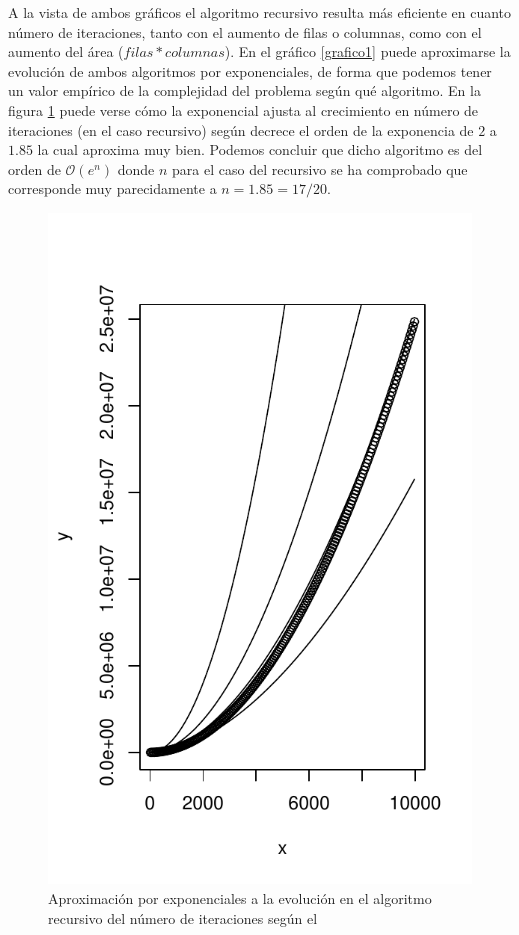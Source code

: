 \documentclass[12pt,a4paper]{article}
\begin{document}
A la vista de ambos gráficos el algoritmo recursivo resulta más eficiente en cuanto número de iteraciones, tanto con el aumento de filas o columnas, como con el aumento del área ($filas*columnas$). En el gráfico \ref{grafico1} puede aproximarse la evolución de ambos algoritmos por exponenciales, de forma que podemos tener un valor empírico de la complejidad del problema según qué algoritmo.
En la figura \ref{grafico3} puede verse cómo la exponencial ajusta al crecimiento en número de iteraciones (en el caso recursivo) según decrece el orden de la exponencia de $2$ a $1.85$ la cual aproxima muy bien. Podemos concluir que dicho algoritmo es del orden de $\mathcal{O}(e^{n})$ donde $n$ para el caso del recursivo se ha comprobado que corresponde muy parecidamente a $n=1.85=17/20$.

\begin{figure}[h]
	\centering
	\includegraphics[scale=0.9]{fotos/iterations_rec_vs_pows}
	\caption{Aproximación por exponenciales a la evolución en el algoritmo recursivo del número de iteraciones según el }
	\label{grafico3}
\end{figure}
\vspace{0.2cm}
\end{document}
